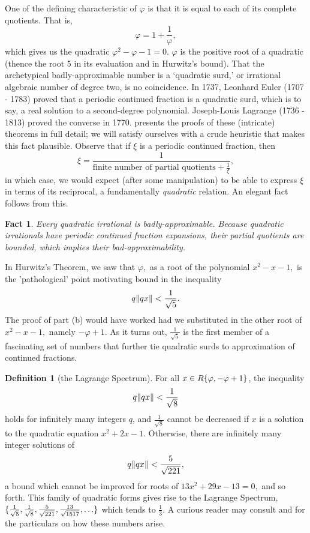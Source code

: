 \documentclass[12pt, letterpaper, oneside]{book}
\newcommand{\gf}{\ensuremath{\varphi}}
\DeclarePairedDelimiter{\norm}{\lVert}{\rVert}
\DeclarePairedDelimiter{\set}{\lbrace}{\rbrace}
\theoremstyle{plain}
\newtheorem{fact}{Fact}
\theoremstyle{definition}
\newtheorem{definition}{Definition}
\theoremstyle{remark}
\begin{document}
One of the defining characteristic of $\gf$ is that it is equal to each of its complete quotients. That is,
\[
\gf = 1 + \frac{1}{\gf},
\]
which gives us the quadratic $\gf^2 - \gf - 1 = 0.$ $\gf$ is the positive root of a quadratic (thence the root 5 in its evaluation and in Hurwitz's bound). That the archetypical badly-approximable number is a `quadratic surd,' or irrational algebraic number of degree two, is no coincidence.  In 1737, Leonhard Euler (1707 - 1783) proved that a periodic continued fraction is a quadratic surd, which is to say, a real solution to a second-degree polynomial. Joseph-Louis Lagrange (1736 - 1813) proved the converse in 1770. \cite{AMR92} presents the proofs of these (intricate) theorems in full detail; we will satisfy ourselves with a crude heuristic that makes this fact plausible. Observe that if $\xi$ is a periodic continued fraction, then
\[
\xi = \frac{1}{\mbox{finite number of partial quotients} + \frac{1}{\xi}},
\]
in which case, we would expect (after some manipulation) to be able to express $\xi$ in terms of its reciprocal, a fundamentally \textit{quadratic} relation. An elegant fact follows from this. 

\begin{fact}
Every quadratic irrational is badly-approximable. Because quadratic irrationals have periodic continued fraction expansions, their partial quotients are bounded, which implies their bad-approximability. 
\end{fact}

In Hurwitz's Theorem, we saw that $\gf,$ as a root of the polynomial $x^2 - x -1,$ is the 'pathological' point  motivating bound in the inequality
\[
q\norm{qx} < \frac{1}{\sqrt{5}}.
\]
The proof of part (b) would have worked had we substituted in the other root of $x^2 - x -1,$ namely $-\gf + 1.$ As it turns out, $\frac{1}{\sqrt{5}}$ is the first member of a fascinating set of numbers that further tie quadratic surds to approximation of continued fractions.

\begin{definition}[the Lagrange Spectrum]
For all $x \in R\\\set{\gf, -\gf + 1}$, the inequality
\[
q\norm{qx} < \frac{1}{\sqrt{8}}
\]
holds for infinitely many integers $q$, and $\frac{1}{\sqrt{8}}$ cannot be decreased if $x$ is a solution to the quadratic equation $x^2 + 2x -1.$ Otherwise, there are infinitely many integer solutions of 
\[
q\norm{qx} < \frac{5}{\sqrt{221}}, 
\]
a bound which cannot be improved for roots of $13x^2 + 29x -13 = 0,$ and so forth. 
This family of quadratic forms gives rise to the Lagrange Spectrum, $\set{\frac{1}{\sqrt{5}}, \frac{1}{\sqrt{8}}, \frac{5}{\sqrt{221}}, \frac{13}{\sqrt{1517}},\ldots}$ which tends to $\frac{1}{3}.$ A curious reader may consult \cite{Cas57} and \cite{AMR92} for the particulars on how these numbers arise.
\end{definition}
\end{document}
